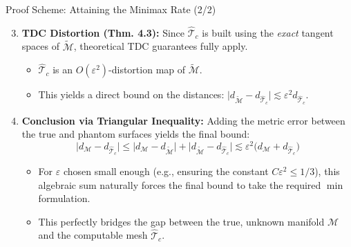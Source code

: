 \documentclass[9pt]{beamer}
\begin{document}
\begin{frame}{Proof Scheme: Attaining the Minimax Rate (2/2)}

\begin{enumerate}
  \setcounter{enumi}{2}
  \item \textbf{TDC Distortion (Thm. 4.3):} Since $\widehat{\mathscr{T}}_c$ is built using the \textit{exact} tangent spaces of $\widetilde{\mathcal{M}}$, theoretical TDC guarantees fully apply. 
  \begin{itemize}
      \item $\widehat{\mathscr{T}}_c$ is an $O(\varepsilon^2)$-distortion map of $\widetilde{\mathcal{M}}$. 
      \item This yields a direct bound on the distances: $\bigl| d_{\widetilde{\mathcal{M}}} - d_{\widehat{\mathscr{T}}_c}\bigr| \lesssim \varepsilon^2 d_{\widehat{\mathscr{T}}_c}$.
  \end{itemize}
  
  \vspace{0.4cm}
  \item \textbf{Conclusion via Triangular Inequality:} Adding the metric error between the true and phantom surfaces yields the final bound:
  $$\bigl| d_{\mathcal{M}}- d_{\widehat{\mathscr{T}}_c}\bigr| \le \bigl| d_{\mathcal{M}}- d_{\widetilde{\mathcal{M}}}\bigr| + \bigl| d_{\widetilde{\mathcal{M}}}- d_{\widehat{\mathscr{T}}_c}\bigr| \lesssim \varepsilon^2\bigl(d_{\mathcal{M}}+d_{\widehat{\mathscr{T}}_c}\bigr)$$
  \begin{itemize}
      \item For $\varepsilon$ chosen small enough (e.g., ensuring the constant $C\varepsilon^2 \le 1/3$), this algebraic sum naturally forces the final bound to take the required $\min$ formulation.
      \item This perfectly bridges the gap between the true, unknown manifold $\mathcal{M}$ and the computable mesh $\widehat{\mathscr{T}}_c$.
  \end{itemize}
\end{enumerate}
\end{frame}

\end{document}

